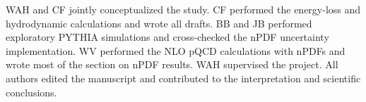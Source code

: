 \documentclass[%
 reprint,
 amsmath,amssymb,
 aps,
 prl,nofootinbib,
 superscriptaddress
]{revtex4-2}
\begin{document}
 WAH and CF jointly conceptualized the study. CF performed the energy-loss and hydrodynamic calculations and wrote all drafts. BB and JB performed exploratory PYTHIA simulations and cross-checked the nPDF uncertainty implementation. WV performed the NLO pQCD calculations with nPDFs and wrote most of the section on nPDF results. WAH supervised the project. All authors edited the manuscript and contributed to the interpretation and scientific conclusions.


\balance


\end{document}
